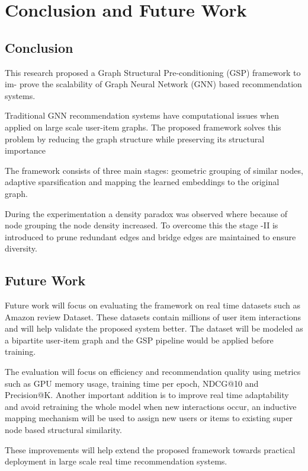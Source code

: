
\chapter{Conclusion and Future Work}
\graphicspath{{Chapter5/}}

\section{Conclusion}

This research proposed a Graph Structural Pre-conditioning (GSP) framework to im-
prove the scalability of Graph Neural Network (GNN) based recommendation systems.

Traditional GNN recommendation systems have computational issues when applied on large scale user-item graphs. The proposed framework solves this problem by reducing the graph structure while preserving its structural importance

The framework consists of three main stages: geometric grouping of similar nodes, adaptive sparsification and mapping the learned embeddings to the original graph.

During the experimentation a density paradox was observed where because of node grouping the node density increased. To overcome this the stage -II is introduced to prune redundant edges and bridge edges are maintained to ensure diversity.


\section{Future Work}

Future work will focus on evaluating the framework on real time datasets such as Amazon review Dataset. These datasets contain millions of user item interactions and will help validate the proposed system better. The dataset will be modeled as a bipartite user-item graph and the GSP pipeline would be applied before training.

The evaluation will focus on efficiency and recommendation quality using metrics such as GPU memory usage, training time per epoch, NDCG@10 and Precision@K.
Another important addition is to improve real time adaptability and avoid retraining the whole model when new interactions occur, an inductive mapping mechanism will be used to assign new users or items to existing super node based structural similarity.

These improvements will help extend the proposed framework towards practical deployment in large scale real time recommendation systems.
